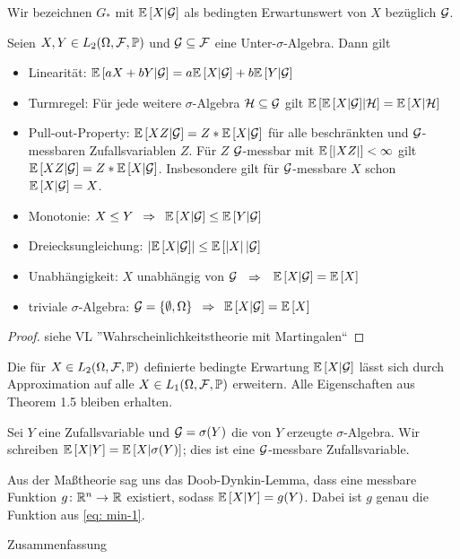 
Wir bezeichnen $G_\ast$ mit $\EW[X|\G]$ als bedingten Erwartunswert von $X$ bezüglich $\G$.

\begin{theorem} %
	Seien $X,Y \in L_2(\Omega,\F,\P)$ und $\G \subseteq \F$ eine Unter-$\sigma$-Algebra. Dann gilt
	\begin{itemize}
		\item Linearität: $\EW[aX + bY | \G] = a \EW[X|\G] + b\EW[Y|\G]$
		\item Turmregel: Für jede weitere $\sigma$-Algebra $\mathcal{H} \subseteq \G$ gilt ${\EW[{\EW[{X|\G}]}|\mathcal{H}]} = {\EW[X|\mathcal{H}]}$
		\item Pull-out-Property: $\EW[XZ|\G] = Z * \EW[X | \G]$ für alle beschränkten und $\G$-messbaren Zufallsvariablen $Z$.
		Für $Z$ $\G$-messbar mit $\EW[\abs{XZ}] < \infty$ gilt $\EW[XZ | \G] = Z * \EW[X | \G]$. Insbesondere gilt für $\G$-messbare $X$ schon $\EW[X|\G]=X$.
		\item Monotonie: $X \le Y \follows \EW[X|\G] \le \EW[Y|\G]$
		\item Dreiecksungleichung: $\abs{\EW[X|\G]} \le \EW[\abs{X}|\G]$
		\item Unabhängigkeit: $X$ unabhängig von $\G$ $\follows$ $\EW[X|\G] = \EW[X]$
		\item triviale $\sigma$-Algebra: $\G=\menge{\emptyset, \Omega} \follows \EW[X|\G] = \EW[X]$
	\end{itemize}
\end{theorem}
\begin{proof}
	siehe VL ''Wahrscheinlichkeitstheorie mit Martingalen``
\end{proof}

Die für $X \in L_2(\Omega,\F,\P)$ definierte bedingte Erwartung $\EW[X|\G]$ lässt sich durch Approximation auf alle $X \in L_1(\Omega,\F,\P)$ erweitern. Alle Eigenschaften aus Theorem 1.5 bleiben erhalten. %

Sei $Y$ eine Zufallsvariable und $\G= \sigma(Y)$ die von $Y$ erzeugte $\sigma$-Algebra. Wir schreiben $\EW[X|Y] = \EW[X|\sigma(Y)]$; dies ist eine $\G$-messbare Zufallsvariable.

Aus der Maßtheorie sag uns das Doob-Dynkin-Lemma, dass eine messbare Funktion $\abb{g}{\Rn}{\R}$ existiert, sodass $\EW[X|Y] = g(Y)$. Dabei ist $g$ genau die Funktion aus \eqref{eq: min-1}.

Zusammenfassung

